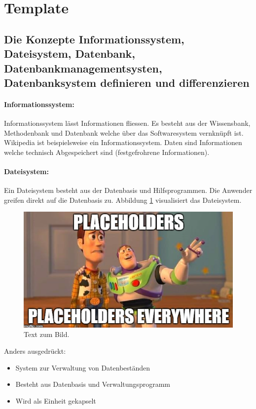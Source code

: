 \section{Template}

\subsection{Die Konzepte Informationssystem, Dateisystem, Datenbank, Datenbankmanagementsysten, Datenbanksystem definieren und differenzieren}

\paragraph{Informationssystem:}
Informationssystem lässt Informationen fliessen. Es besteht aus der Wissensbank, Methodenbank und Datenbank welche über das Softwaresystem vernknüpft ist.
Wikipedia ist beispielsweise ein Informationssystem. Daten sind Informationen welche technisch Abgespeichert sind (festgefrohrene Informationen).

\paragraph{Dateisystem:}

Ein Dateisystem besteht aus der Datenbasis und Hilfsprogrammen. Die Anwender greifen direkt auf die Datenbasis zu. Abbildung \ref{fig:Dateisystem mit Anwenderinteraktion} visualisiert das Dateisystem.

\begin{figure}[H]
	\centering
	\includegraphics[width=0.55\columnwidth]{9_Template/Bilder/Placeholder.png}
	\caption{Text zum Bild.}
	\label{fig:Dateisystem mit Anwenderinteraktion}
\end{figure}

Anders ausgedrückt:

\begin{itemize}
\item System zur Verwaltung von Datenbeständen
\item Besteht aus Datenbasis und Verwaltungsprogramm
\item Wird als Einheit gekapselt
\end{itemize}

